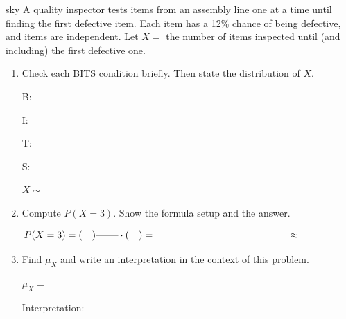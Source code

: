 \documentclass[10pt]{article}
\begin{document}
\namedateperiod

\vspace{0.14in}

\begin{scenariobox}[Context]{sky}
\small
A quality inspector tests items from an assembly line one at a time until
finding the first defective item. Each item has a 12\% chance of being
defective, and items are independent. Let $X =$ the number of items
inspected until (and including) the first defective one.
\end{scenariobox}

\vspace{0.1in}

\begin{practicebox}
\small
\begin{enumerate}[leftmargin=1.5em, itemsep=10pt]

  \item Check each BITS condition briefly. Then state the distribution of $X$.

  \vspace{4pt}
  B: \writeline

  I: \writeline

  T: \writeline

  S: \writeline

  \vspace{4pt}
  $X \sim$ \blank{4cm}

  \item Compute $P(X = 3)$. Show the formula setup and the answer.

  \[
    P(X = 3) = (\quad)^{\blank{0.8cm}} \cdot (\quad) = \hspace{5cm} \approx \hspace{2cm}
  \]

  \item Find $\mu_X$ and write an interpretation in the context of this problem.

  \vspace{4pt}
  $\mu_X = $ \blank{3cm}

  \vspace{4pt}
  Interpretation: \writeline\\[1pt]\writeline

\end{enumerate}
\end{practicebox}
\end{document}

